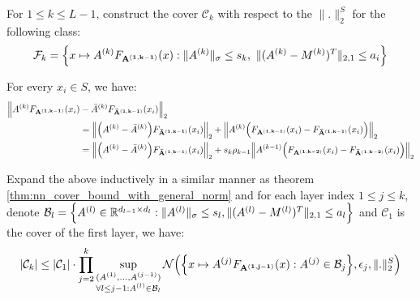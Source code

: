 \noindent For $1\le k \le L-1$, construct the cover $\mathcal{C}_k$ with respect to the $\|.\|_2^S$ for the following class:
\begin{align*}
    \mathcal{F}_k = \Big\{ 
        x\mapsto A^{(k)}F_{\bf A^{(1, k-1)}}(x) : \|A^{(k)}\|_\sigma \le s_k, \ \|(A^{(k)} - M^{(k)})^T\|_{2, 1}\le a_i 
     \Big\}
\end{align*}

\noindent For every $x_i\in S$, we have:
\begin{align*}
    \Big\|A^{(k)}F_{\bf A^{(1, k-1)}}(x_i) &- {\bar A}^{(k)}F_{\bf {\bar A}^{(1, k-1)}}(x_i)\Big\|_2 \\
        &= \Big\|
            \Big( A^{(k)} - {\bar A}^{(k)} \Big)F_{\bf {\bar A}^{(1, k-1)}}(x_i)
        \Big\|_2 + \Big\|
            A^{(k)}\Big( F_{\bf A^{(1, k-1)}}(x_i) - F_{\bf {\bar A}^{(1, k-1)}}(x_i) \Big)
        \Big\|_2 \\
        &= \Big\|
            \Big( A^{(k)} - {\bar A}^{(k)} \Big)F_{\bf {\bar A}^{(1, k-1)}}(x_i)
        \Big\|_2 + s_k\rho_{k-1}\Big\|
            A^{(k-1)}\Big( F_{\bf A^{(1, k-2)}}(x_i) - F_{\bf {\bar A}^{(1, k-2)}}(x_i) \Big)
        \Big\|_2 \\
\end{align*}

\noindent Expand the above inductively in a similar manner as theorem \ref{thm:nn_cover_bound_with_general_norm} and for each layer index $1\le j\le k$, denote $\mathcal{B}_l=\Big\{ A^{(l)}\in\mathbb{R}^{d_{l-1}\times d_l} : \|A^{(l)}\|_\sigma\le s_l, \|(A^{(l)}-M^{(l)})^T\|_{2, 1} \le a_l \Big\}$ and $\mathcal{C}_1$ is the cover of the first layer, we have:
\begin{align*}
    |\mathcal{C}_k| \le |\mathcal{C}_1| \cdot \prod_{j=2}^k \sup_{ 
        \substack{
            (A^{(1)}, \dots, A^{(j-1)}) \\
            \forall l \le j-1:A^{(l)}\in\mathcal{B}_l
        } 
    } \mathcal{N}\Big( 
        \Big\{ 
            x\mapsto A^{(j)}F_{\bf A^{(1, j-1)}}(x) : A^{(j)}\in\mathcal{B}_j
         \Big\}, \epsilon_j, \|.\|_2^S 
     \Big)
\end{align*}

